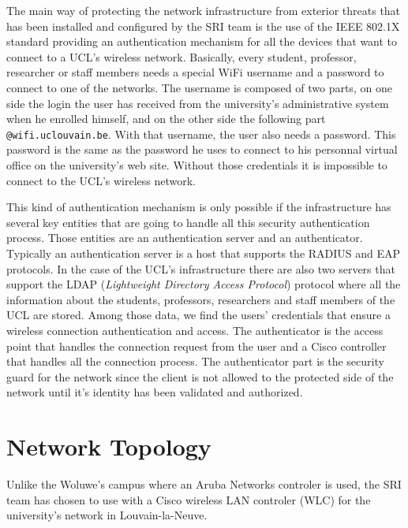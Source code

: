 The main way of protecting the network infrastructure from exterior threats that has been installed and configured by the SRI team is the use of the IEEE 802.1X standard providing an authentication mechanism for all the devices that want to connect to a UCL's wireless network.
Basically, every student, professor, researcher or staff members needs a special WiFi username and a password to connect to one of the networks. The username is composed of two parts, on one side the login the user has received from the university's administrative system when he enrolled himself, and on the other side the following part \texttt{@wifi.uclouvain.be}. With that username, the user also needs a password. This password is the same as the password he uses to connect to his personnal virtual office on the university's web site. Without those credentials it is impossible to connect to the UCL's wireless network.

This kind of authentication mechanism is only possible if the infrastructure has several key entities that are going to handle all this security authentication process. Those entities are an authentication server and an authenticator. Typically an authentication server is a host that supports the RADIUS and  EAP protocols. In the case of the UCL's infrastructure there are also two servers that support the LDAP (\textit{Lightweight Directory Access Protocol}) protocol where all the information about the students, professors, researchers and staff members of the UCL are stored. Among those data, we find the users' credentials that ensure a wireless connection authentication and access. The authenticator is the access point that handles the connection request from the user and a Cisco controller that handles all the connection process. The authenticator part is the security guard for the network since the client is not allowed to the protected side of the network until it's identity has been validated and authorized.


\section{Network Topology}
Unlike the Woluwe's campus where an Aruba Networks controler is used, the SRI team has chosen to use with a Cisco wireless LAN controler (WLC) for the university's network in Louvain-la-Neuve.



